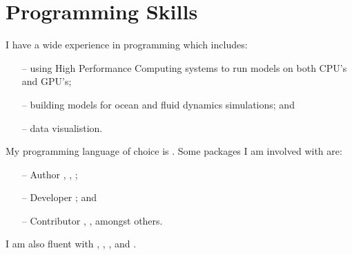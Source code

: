 \section{Programming Skills}

I have a wide experience in programming which includes:
\begin{itemize}
    \item[--] using High Performance Computing systems to run models on both CPU's and GPU's;
    \item[--] building models for ocean and fluid dynamics simulations; and 
    \item[--] data visualistion.
\end{itemize}
My programming language of choice is .
Some packages I am involved with are:
\begin{itemize}
    \item[--] Author , , ;
    \item[--] Developer ; and
    \item[--] Contributor , ,  amongst others.
\end{itemize}
I am also fluent with , , ,  and .
